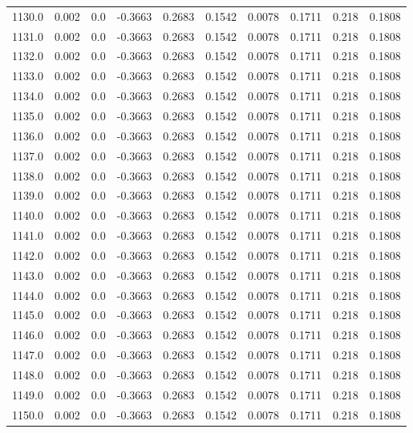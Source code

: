 \begin{longtable}{lrrrrrrrrr}
1130.0 & 0.002 & 0.0 & -0.3663 & 0.2683 & 0.1542 & 0.0078 & 0.1711 & 0.218 & 0.1808 \\
1131.0 & 0.002 & 0.0 & -0.3663 & 0.2683 & 0.1542 & 0.0078 & 0.1711 & 0.218 & 0.1808 \\
1132.0 & 0.002 & 0.0 & -0.3663 & 0.2683 & 0.1542 & 0.0078 & 0.1711 & 0.218 & 0.1808 \\
1133.0 & 0.002 & 0.0 & -0.3663 & 0.2683 & 0.1542 & 0.0078 & 0.1711 & 0.218 & 0.1808 \\
1134.0 & 0.002 & 0.0 & -0.3663 & 0.2683 & 0.1542 & 0.0078 & 0.1711 & 0.218 & 0.1808 \\
1135.0 & 0.002 & 0.0 & -0.3663 & 0.2683 & 0.1542 & 0.0078 & 0.1711 & 0.218 & 0.1808 \\
1136.0 & 0.002 & 0.0 & -0.3663 & 0.2683 & 0.1542 & 0.0078 & 0.1711 & 0.218 & 0.1808 \\
1137.0 & 0.002 & 0.0 & -0.3663 & 0.2683 & 0.1542 & 0.0078 & 0.1711 & 0.218 & 0.1808 \\
1138.0 & 0.002 & 0.0 & -0.3663 & 0.2683 & 0.1542 & 0.0078 & 0.1711 & 0.218 & 0.1808 \\
1139.0 & 0.002 & 0.0 & -0.3663 & 0.2683 & 0.1542 & 0.0078 & 0.1711 & 0.218 & 0.1808 \\
1140.0 & 0.002 & 0.0 & -0.3663 & 0.2683 & 0.1542 & 0.0078 & 0.1711 & 0.218 & 0.1808 \\
1141.0 & 0.002 & 0.0 & -0.3663 & 0.2683 & 0.1542 & 0.0078 & 0.1711 & 0.218 & 0.1808 \\
1142.0 & 0.002 & 0.0 & -0.3663 & 0.2683 & 0.1542 & 0.0078 & 0.1711 & 0.218 & 0.1808 \\
1143.0 & 0.002 & 0.0 & -0.3663 & 0.2683 & 0.1542 & 0.0078 & 0.1711 & 0.218 & 0.1808 \\
1144.0 & 0.002 & 0.0 & -0.3663 & 0.2683 & 0.1542 & 0.0078 & 0.1711 & 0.218 & 0.1808 \\
1145.0 & 0.002 & 0.0 & -0.3663 & 0.2683 & 0.1542 & 0.0078 & 0.1711 & 0.218 & 0.1808 \\
1146.0 & 0.002 & 0.0 & -0.3663 & 0.2683 & 0.1542 & 0.0078 & 0.1711 & 0.218 & 0.1808 \\
1147.0 & 0.002 & 0.0 & -0.3663 & 0.2683 & 0.1542 & 0.0078 & 0.1711 & 0.218 & 0.1808 \\
1148.0 & 0.002 & 0.0 & -0.3663 & 0.2683 & 0.1542 & 0.0078 & 0.1711 & 0.218 & 0.1808 \\
1149.0 & 0.002 & 0.0 & -0.3663 & 0.2683 & 0.1542 & 0.0078 & 0.1711 & 0.218 & 0.1808 \\
1150.0 & 0.002 & 0.0 & -0.3663 & 0.2683 & 0.1542 & 0.0078 & 0.1711 & 0.218 & 0.1808 \\

\end{longtable}
